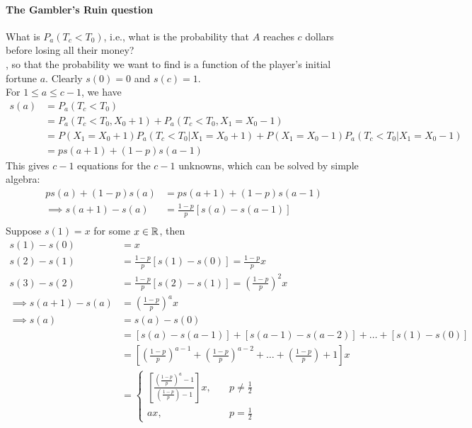 \documentclass[11pt]{article}
\begin{document}
    \paragraph{The Gambler's Ruin question} What is $P_a(T_c < T_0)$, i.e., what is the probability that $A$ reaches $c$ dollars before losing all their money? \\
     , so that the probability we want to find is a function of the player's initial fortune $a$. Clearly $s(0) = 0$ and $s(c) = 1$.\\
    For $1 \leq a \leq c - 1$, we have
    \begin{align*}
    	s(a) &= P_a(T_c < T_0) \\
    	&= P_a(T_c < T_0, X_0 + 1) + P_a(T_c < T_0, X_1 = X_0 - 1) \tag{$A$ either wins or loses $\$1$ on the first bet} \\
    	&= P(X_1 = X_0 + 1)P_a(T_c < T_0 | X_1 = X_0 + 1)+P(X_1 = X_0 - 1)P_a(T_c < T_0 | X_1 = X_0 - 1)\\
    	&= ps(a+1) + (1-p)s(a-1)
    \end{align*}
    This gives $c - 1$ equations for the $c - 1$ unknowns, which can be solved by simple algebra:
    \begin{align*}
    	ps(a) + (1-p)s(a) &= ps(a+1) + (1-p)s(a-1) \tag{re-arranging}\\
    	\implies s(a+1) - s(a) &= \frac{1-p}{p}[s(a) - s(a-1)]\\
    \end{align*}
    Suppose $s(1) = x$ for some $x \in \mathbb{R}$, then
    \begin{align*}
    	s(1) - s(0) &= x \\
    	s(2) - s(1) &= \frac{1-p}{p}[s(1) - s(0)] = \frac{1-p}{p}x\\
    	s(3) - s(2) &= \frac{1-p}{p}[s(2) - s(1)] = \left(\frac{1-p}{p}\right)^2x \\
    	\implies s(a+1) - s(a) &= \left(\frac{1-p}{p}\right)^ax \quad \tag{for $1 \leq a \leq c$}\\
    	\implies s(a) &= s(a) - s(0) \\
    	&= [s(a) - s(a-1)] + [s(a-1) - s(a-2)] + \hdots + [s(1) - s(0)] \\
    	&= \left[\left(\frac{1-p}{p}\right)^{a-1} + \left(\frac{1-p}{p}\right)^{a-2} + \hdots + \left(\frac{1-p}{p}\right) + 1 \right]x\\
    	&= \begin{cases}
    		\left[ \frac{(\frac{1-p}{p})^a - 1}{(\frac{1-p}{p}) - 1} \right] x, \quad &p \neq \frac{1}{2} \\
    		ax, \quad & p = \frac{1}{2}
    	\end{cases}
    \end{align*}
\end{document}
